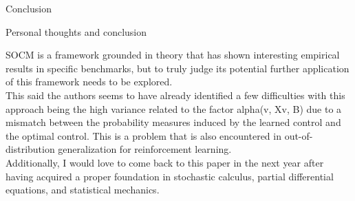 \documentclass[aspectratio=169,xcolor=dvipsnames]{beamer}
\begin{document}
\begin{frame}{Conclusion}

    \begin{block}{Personal thoughts and conclusion}

    SOCM is a framework grounded in theory that has shown interesting empirical results in specific benchmarks, but to truly judge its potential further application of this framework needs to be explored. 
    \\
    \vspace{0.2cm}
    This said the authors seems to have already identified a few difficulties with this approach being the high variance related to the factor alpha(v, Xv, B) due to a mismatch between the probability measures induced by the learned control and the optimal control. This is a problem that is also encountered in out-of-distribution generalization for reinforcement learning.
    \\
    \vspace{0.2cm}
    Additionally, I would love to come back to this paper in the next year after having acquired a proper foundation in stochastic calculus, partial differential equations, and statistical mechanics.

    \end{block}

\end{frame}
\end{document}
